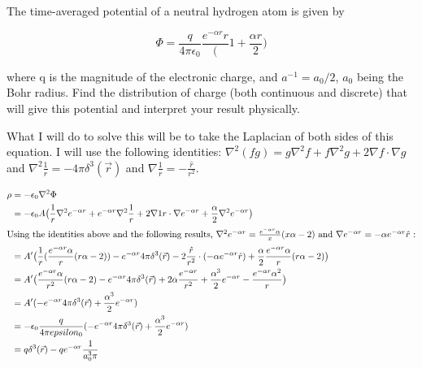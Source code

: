 \begin{homeworkProblem}

The time-averaged potential of a neutral hydrogen atom is given by 

\begin{equation}
\Phi = \frac{q}{4\pi\epsilon_0}\frac{e^{-\alpha r}{r}}(1+\frac{\alpha r}{2})
\end{equation}
 
where q is the magnitude of the electronic charge, and $a^{-1} = a_0/2$, $a_0$ being the 
Bohr radius. Find the distribution of charge (both continuous and discrete) that will 
give this potential and interpret your result physically. 

What I will do to solve this will be to take the Laplacian of both sides of this equation. I will use the following identities: $\nabla^2 (f g) = g \nabla^2 f + f \nabla^2 g + 2 \nabla f \cdot \nabla g $ and $\nabla^2 \frac{1}{r} = -4\pi \delta^3(\vec{r})$ and $\nabla \frac{1}{r} = -\frac{\hat{r}}{r^2}$.


\begin{align}
	\rho &= -\epsilon_0 \nabla^2 \Phi \nonumber \\
	&=-\epsilon_0 A \big(\frac{1}{r}\nabla^2 e^{-\alpha r} + e^{-\alpha r}\nabla^2 \frac{1}{r} + 2 \nabla {1}{r} \cdot \nabla e^{-\alpha r} + \frac{\alpha}{2}\nabla^2 e^{-\alpha r}\big) \nonumber \\
	\intertext{Using the identities above and the following results, $\nabla^2 e^{- \alpha r} = \frac{e^{-\alpha r}\alpha}{x}(x\alpha -2)$ and $\nabla e^{-\alpha r} = - \alpha e^{-\alpha r} \hat{r}$ :}
		&= A' \big(\frac{1}{r}(\frac{e^{-\alpha r}\alpha}{r}(r\alpha -2)) - e^{-\alpha r}4\pi \delta^3(\vec{r})-2	\frac{\hat{r}}{r^2} \cdot (-\alpha e^{-\alpha r} \hat{r}) + \frac{\alpha}{2}\frac{e^{-\alpha r}\alpha}{r}(r\alpha -2)\big) \nonumber \\
	&= A' \big( \frac{e^{-\alpha r}\alpha}{r^2}(r\alpha -2) - e^{-\alpha r}4\pi \delta^3(\vec{r}) + 2 \alpha \frac{e^{-\alpha r}}{r^2} + \frac{\alpha^3}{2} e^{-\alpha r} -\frac{e^{-\alpha r} \alpha^2}{r} \big) \nonumber \\
	&= A' (-e^{-\alpha r} 4\pi \delta^3(\vec{r}) + \frac{\alpha^3}{2}e^{-\alpha r}) \nonumber \\
	&= -\epsilon_0 \frac{q}{4\pi epsilon_0} (-e^{-\alpha r} 4\pi \delta^3(\vec{r}) + \frac{\alpha^3}{2}e^{-\alpha r}) \nonumber \\
	&= q \delta^3(\vec{r}) - q e^{-\alpha r} \frac{1}{a_0^3 \pi} \nonumber
\end{align}


\end{homeworkProblem}
